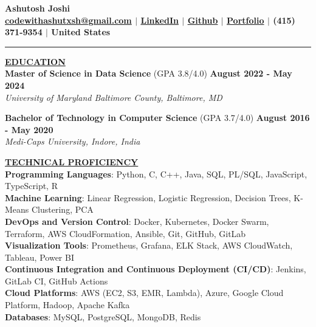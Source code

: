 \documentclass{article}
\begin{document}
\begin{center}
\thispagestyle{empty}
\large \textbf{Ashutosh Joshi \\}
\normalsize \textbf{\href{mailto:codewithashutxsh@gmail.com}{codewithashutxsh@gmail.com} $\mid$ \href{https://www.linkedin.com/in/ashutosh--joshi/}{LinkedIn} $\mid$ \href{https://github.com/ashutoshjoshi1}{Github} $\mid$ \href{https://ashutoshjoshi1.github.io/Portfolio/}{Portfolio} $\mid$ (415) 371-9354 $\mid$ United States \\}
\rule{\textwidth}{1pt}
\end{center}

\noindent \textbf{\underline{EDUCATION}} \\
\textbf{Master of Science in Data Science} (GPA 3.8/4.0)  \hfill \textbf{August 2022 - May 2024} \\
\textit{University of Maryland Baltimore County, Baltimore, MD}\\
\begin{itemize}[noitemsep,nolistsep,leftmargin=*]
\end{itemize}
\textbf{Bachelor of Technology in Computer Science} (GPA 3.7/4.0) \hfill \textbf{August 2016 - May 2020} \\
\textit{Medi-Caps University, Indore, India} 
\vspace{2mm} 

\noindent \textbf{\underline{TECHNICAL PROFICIENCY}} \\
\textbf{Programming Languages}{: \small Python, C, C++, Java, SQL, PL/SQL, JavaScript, TypeScript, R} \\
\textbf{Machine Learning}{: \small Linear Regression, Logistic Regression, Decision Trees, K-Means Clustering, PCA} \\
\textbf{DevOps and Version Control}{: \small Docker, Kubernetes, Docker Swarm, Terraform, AWS CloudFormation, Ansible, Git, GitHub, GitLab} \\
\textbf{Visualization Tools}{: \small Prometheus, Grafana, ELK Stack, AWS CloudWatch, Tableau, Power BI} \\
\textbf{Continuous Integration and Continuous Deployment (CI/CD)}{: \small Jenkins, GitLab CI, GitHub Actions} \\
\textbf{Cloud Platforms}{: \small AWS (EC2, S3, EMR, Lambda), Azure, Google Cloud Platform, Hadoop, Apache Kafka} \\
\textbf{Databases}{: \small MySQL, PostgreSQL, MongoDB, Redis} 
\end{document}
